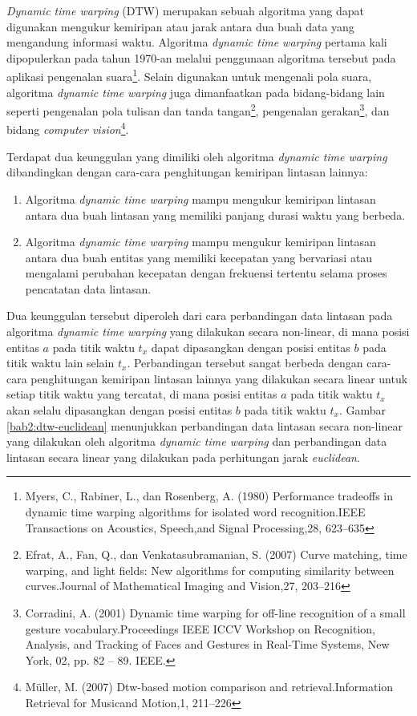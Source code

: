 \documentclass[a4paper,twoside]{article}
\begin{document}
\textit{Dynamic time warping} (DTW) merupakan sebuah algoritma yang dapat digunakan mengukur kemiripan atau jarak antara dua buah data yang mengandung informasi waktu. Algoritma \textit{dynamic time warping} pertama kali dipopulerkan pada tahun 1970-an melalui penggunaan algoritma tersebut pada aplikasi pengenalan suara\footnote{Myers, C., Rabiner, L., dan Rosenberg, A. (1980) Performance tradeoffs in dynamic time warping algorithms for isolated word recognition.IEEE Transactions on Acoustics, Speech,and Signal Processing,28, 623–635}. Selain digunakan untuk mengenali pola suara, algoritma \textit{dynamic time warping} juga dimanfaatkan pada bidang-bidang lain seperti pengenalan pola tulisan dan tanda tangan\footnote{Efrat, A., Fan, Q., dan Venkatasubramanian, S. (2007) Curve matching, time warping, and light fields: New algorithms for computing similarity between curves.Journal of Mathematical Imaging and Vision,27, 203–216}, pengenalan gerakan\footnote{Corradini, A. (2001) Dynamic time warping for off-line recognition of a small gesture vocabulary.Proceedings IEEE ICCV Workshop on Recognition, Analysis, and Tracking of Faces and Gestures in Real-Time Systems, New York, 02, pp. 82 – 89. IEEE.}, dan bidang \textit{computer vision}\footnote{M\"{u}ller, M. (2007) Dtw-based motion comparison and retrieval.Information Retrieval for Musicand Motion,1, 211–226}. 

Terdapat dua keunggulan yang dimiliki oleh algoritma \textit{dynamic time warping} dibandingkan dengan cara-cara penghitungan kemiripan lintasan lainnya:

\begin{enumerate}
    \item Algoritma \textit{dynamic time warping} mampu mengukur kemiripan lintasan antara dua buah lintasan yang memiliki panjang durasi waktu yang berbeda.
    \item Algoritma \textit{dynamic time warping} mampu mengukur kemiripan lintasan antara dua buah entitas yang memiliki kecepatan yang bervariasi atau mengalami perubahan kecepatan dengan frekuensi tertentu selama proses pencatatan data lintasan.
\end{enumerate}

Dua keunggulan tersebut diperoleh dari cara perbandingan data lintasan pada algoritma \textit{dynamic time warping} yang dilakukan secara non-linear, di mana posisi entitas $a$ pada titik waktu $t_x$ dapat dipasangkan dengan posisi entitas $b$ pada titik waktu lain selain $t_x$. Perbandingan tersebut sangat berbeda dengan cara-cara penghitungan kemiripan lintasan lainnya yang dilakukan secara linear untuk setiap titik waktu yang tercatat, di mana posisi entitas $a$ pada titik waktu $t_x$ akan selalu dipasangkan dengan posisi entitas $b$ pada titik waktu $t_x$. Gambar \ref{bab2:dtw-euclidean} menunjukkan perbandingan data lintasan secara non-linear yang dilakukan oleh algoritma \textit{dynamic time warping} dan perbandingan data lintasan secara linear yang dilakukan pada perhitungan jarak \textit{euclidean}.
\end{document}
